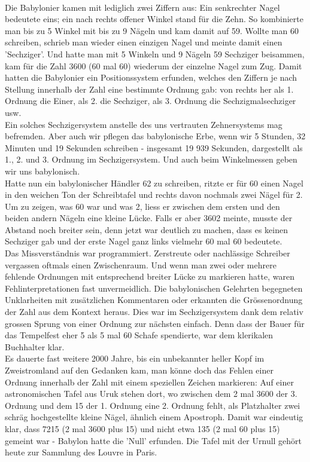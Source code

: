 \documentclass[%
11pt,%
twoside,%
titlepage,%
german,%
headsepline%
]{scrartcl}
\begin{document}
\begin{multicols}{2}
\\
Die Babylonier kamen mit lediglich zwei Ziffern aus: Ein senkrechter Nagel bedeutete eins; ein nach rechts offener Winkel stand für die Zehn. So kombinierte man bis zu 5 Winkel mit bis zu 9 Nägeln und kam damit auf 59. Wollte man 60 schreiben, schrieb man wieder einen einzigen Nagel und meinte damit einen 'Sechziger'. Und hatte man mit 5 Winkeln und 9 Nägeln 59 Sechziger beisammen, kam für die Zahl 3600 (60 mal 60) wiederum der einzelne Nagel zum Zug. Damit hatten die Babylonier ein Positionssystem erfunden, welches den Ziffern je nach Stellung innerhalb der Zahl eine bestimmte Ordnung gab: von rechts her als 1. Ordnung die Einer, als 2. die Sechziger, als 3. Ordnung die Sechzigmalsechziger usw.
\\
Ein solches Sechzigersystem anstelle des uns vertrauten Zehnersystems mag befremden. Aber auch wir pflegen das babylonische Erbe, wenn wir 5 Stunden, 32 Minuten und 19 Sekunden schreiben - insgesamt 19 939 Sekunden, dargestellt als 1., 2. und 3. Ordnung im Sechzigersystem. Und auch beim Winkelmessen geben wir uns babylonisch.
\\
Hatte nun ein babylonischer Händler 62 zu schreiben, ritzte er für 60 einen Nagel in den weichen Ton der Schreibtafel und rechts davon nochmals zwei Nägel für 2. Um zu zeigen, was 60 war und was 2, liess er zwischen dem ersten und den beiden andern Nägeln eine kleine Lücke. Falls er aber 3602 meinte, musste der Abstand noch breiter sein, denn jetzt war deutlich zu machen, dass es keinen Sechziger gab und der erste Nagel ganz links vielmehr 60 mal 60 bedeutete.
\\
Das Missverständnis war programmiert. Zerstreute oder nachlässige Schreiber vergassen oftmals einen Zwischenraum. Und wenn man zwei oder mehrere fehlende Ordnungen mit entsprechend breiter Lücke zu markieren hatte, waren Fehlinterpretationen fast unvermeidlich. Die babylonischen Gelehrten begegneten Unklarheiten mit zusätzlichen Kommentaren oder erkannten die Grössenordnung der Zahl aus dem Kontext heraus. Dies war im Sechzigersystem dank dem relativ grossen Sprung von einer Ordnung zur nächsten einfach. Denn dass der Bauer für das Tempelfest eher 5 als 5 mal 60 Schafe spendierte, war dem klerikalen Buchhalter klar.
\\[5mm]
Es dauerte fast weitere 2000 Jahre, bis ein unbekannter heller Kopf im Zweistromland auf den Gedanken kam, man könne doch das Fehlen einer Ordnung innerhalb der Zahl mit einem speziellen Zeichen markieren: Auf einer astronomischen Tafel aus Uruk stehen dort, wo zwischen dem 2 mal 3600 der 3. Ordnung und dem 15 der 1. Ordnung eine 2. Ordnung fehlt, als Platzhalter zwei schräg hochgestellte kleine Nägel, ähnlich einem Apostroph. Damit war eindeutig klar, dass 7215 (2 mal 3600 plus 15) und nicht etwa 135 (2 mal 60 plus 15) gemeint war - Babylon hatte die 'Null' erfunden. Die Tafel mit der Urnull gehört heute zur Sammlung des Louvre in Paris.

\end{multicols}
\end{document}
